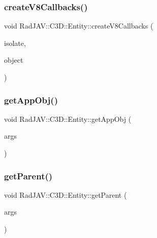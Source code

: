 \subsubsection{\texorpdfstring{create\+V8\+Callbacks()}{createV8Callbacks()}}
{\footnotesize\ttfamily void Rad\+J\+A\+V\+::\+C3\+D\+::\+Entity\+::create\+V8\+Callbacks (\begin{DoxyParamCaption}\item[{v8\+::\+Isolate $\ast$}]{isolate,  }\item[{v8\+::\+Local$<$ v8\+::\+Object $>$}]{object }\end{DoxyParamCaption})\hspace{0.3cm}{\ttfamily [static]}}

\mbox{\label{class_rad_j_a_v_1_1_c3_d_1_1_entity_a0e8002d937c984ff4b52699d225a08cd}} 
\subsubsection{\texorpdfstring{get\+App\+Obj()}{getAppObj()}}
{\footnotesize\ttfamily void Rad\+J\+A\+V\+::\+C3\+D\+::\+Entity\+::get\+App\+Obj (\begin{DoxyParamCaption}\item[{const v8\+::\+Function\+Callback\+Info$<$ v8\+::\+Value $>$ \&}]{args }\end{DoxyParamCaption})\hspace{0.3cm}{\ttfamily [static]}}

\mbox{\label{class_rad_j_a_v_1_1_c3_d_1_1_entity_a23869d3a90214cde99fce76757a6ef55}} 
\subsubsection{\texorpdfstring{get\+Parent()}{getParent()}}
{\footnotesize\ttfamily void Rad\+J\+A\+V\+::\+C3\+D\+::\+Entity\+::get\+Parent (\begin{DoxyParamCaption}\item[{const v8\+::\+Function\+Callback\+Info$<$ v8\+::\+Value $>$ \&}]{args }\end{DoxyParamCaption})\hspace{0.3cm}{\ttfamily [static]}}

